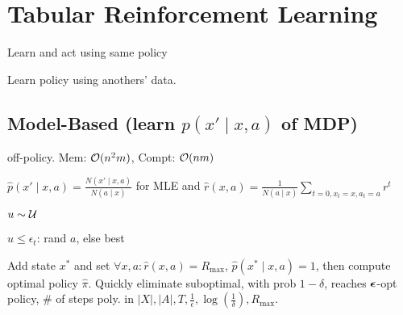 \section{Tabular Reinforcement Learning}

\begin{definition}[On-Policy]
    Learn and act using same policy
\end{definition}

\begin{definition}
    Learn policy using anothers' data.
\end{definition}

\subsection{Model-Based (learn \(p(x' \mid x, a)\) of MDP)}

off-policy.  Mem: \(\mathcal{O}(n^2m)\), Compt: \(\mathcal{O}(nm)\)

\begin{definition}[MC-Control]
    \(\hat p(x' \mid x, a) = \frac{N(x' \mid x, a)}{N(a \mid x)}\) for MLE and \(\hat r(x, a) = \frac{1}{N(a \mid x)} \sum_{t=0, x_t = x, a_t = a}r^t\)
\end{definition}

\begin{definition}
    \begin{enumerate*}
        \item \(u \sim \operatorname{\mathcal{U}}\)
        \item \(u \leq \epsilon_t\): rand \(a\), else best
    \end{enumerate*}
\end{definition}

\begin{definition}[\(\bm R_{\max}\)]
    Add state \(x^\ast\) and set \(\forall x, a: \hat r(x, a) = R_{\max}\), \(\hat p(x^* \mid x, a) = 1\), then compute optimal policy \(\hat\pi\).
    Quickly eliminate suboptimal, with prob \(1 - \delta\), reaches \(\vb*{\epsilon}\)-opt policy, \(\#\) of steps poly. in \(|X|, |A|, T, \frac{1}{\epsilon}, \log(\frac{1}{\delta}), R_{\max}\).
\end{definition}

